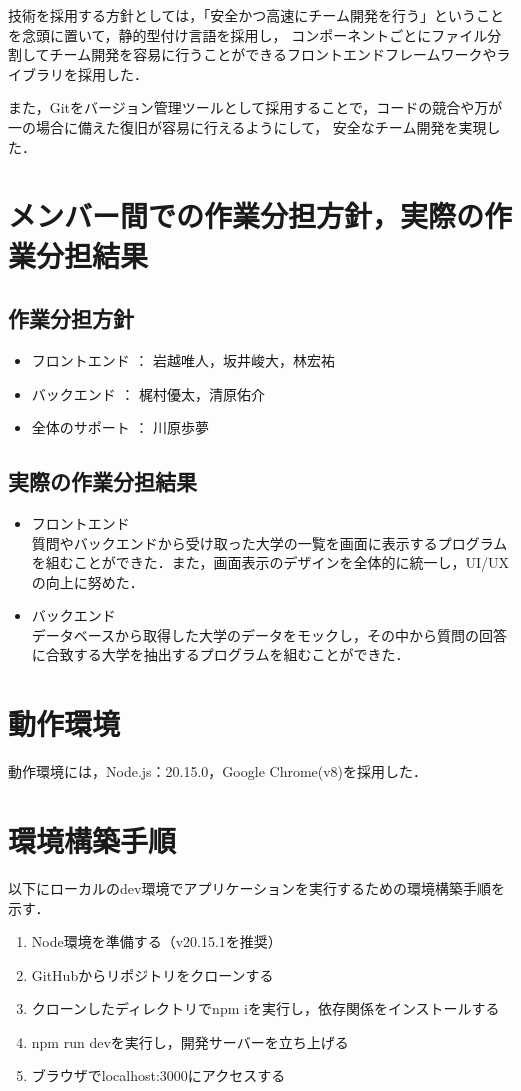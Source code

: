 \documentclass[a4j, titlepage]{jarticle}
\begin{document}
技術を採用する方針としては，「安全かつ高速にチーム開発を行う」ということを念頭に置いて，静的型付け言語を採用し，
コンポーネントごとにファイル分割してチーム開発を容易に行うことができるフロントエンドフレームワークやライブラリを採用した．

また，Gitをバージョン管理ツールとして採用することで，コードの競合や万が一の場合に備えた復旧が容易に行えるようにして，
安全なチーム開発を実現した．

\section{メンバー間での作業分担方針，実際の作業分担結果}

\subsection{作業分担方針}
\begin{itemize}
\item フロントエンド ： 岩越唯人，坂井峻大，林宏祐
\item バックエンド ： 梶村優太，清原佑介
\item 全体のサポート ： 川原歩夢
\end{itemize}

\subsection{実際の作業分担結果}
\begin{itemize}
\item{フロントエンド} \\
質問やバックエンドから受け取った大学の一覧を画面に表示するプログラムを組むことができた．また，画面表示のデザインを全体的に統一し，UI/UXの向上に努めた．
\item{バックエンド} \\
データベースから取得した大学のデータをモックし，その中から質問の回答に合致する大学を抽出するプログラムを組むことができた．
\end{itemize}

\section{動作環境}
動作環境には，Node.js：20.15.0，Google Chrome(v8)を採用した．
\section{環境構築手順}
以下にローカルのdev環境でアプリケーションを実行するための環境構築手順を示す．
\begin{enumerate}
\item Node環境を準備する（v20.15.1を推奨）
\item GitHubからリポジトリをクローンする
\item クローンしたディレクトリでnpm iを実行し，依存関係をインストールする
\item npm run devを実行し，開発サーバーを立ち上げる
\item ブラウザでlocalhost:3000にアクセスする
\end{enumerate}
\end{document}
